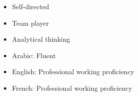 \twocolumnsection
{
    \vspace{1em}
    \begin{itemize}
    	\item Self-directed
    	\item Team player
        \item Analytical thinking
    \end{itemize}}
{
\vspace{1em}
\begin{itemize}
    \item Arabic: Fluent
    \item English: Professional working proficiency
    \item French: Professional working proficiency
\end{itemize}}
